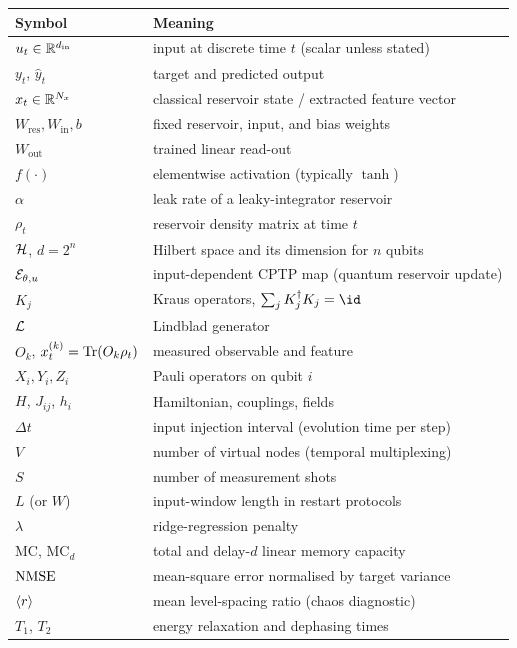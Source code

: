 \begin{center}
\small
\begin{tabular}{@{}ll@{}}
\toprule
Symbol & Meaning \\
\midrule
$u_t \in \mathbb{R}^{d_{\mathrm{in}}}$ & input at discrete time $t$ (scalar unless stated) \\
$y_t$, $\hat y_t$ & target and predicted output \\
$x_t \in \mathbb{R}^{N_x}$ & classical reservoir state / extracted feature vector \\
$W_{\mathrm{res}}, W_{\mathrm{in}}, b$ & fixed reservoir, input, and bias weights \\
$W_{\mathrm{out}}$ & trained linear read-out \\
$f(\cdot)$ & elementwise activation (typically $\tanh$) \\
$\alpha$ & leak rate of a leaky-integrator reservoir \\
$\rho_t$ & reservoir density matrix at time $t$ \\
$\mathcal{H}$, $d=2^n$ & Hilbert space and its dimension for $n$ qubits \\
$\mathcal{E}_{\theta,u}$ & input-dependent CPTP map (quantum reservoir update) \\
$K_j$ & Kraus operators, $\sum_j K_j^\dagger K_j = \id$ \\
$\mathcal{L}$ & Lindblad generator \\
$O_k$, $x_t^{(k)}=\operatorname{Tr}(O_k\rho_t)$ & measured observable and feature \\
$X_i, Y_i, Z_i$ & Pauli operators on qubit $i$ \\
$H$, $J_{ij}$, $h_i$ & Hamiltonian, couplings, fields \\
$\Delta t$ & input injection interval (evolution time per step) \\
$V$ & number of virtual nodes (temporal multiplexing) \\
$S$ & number of measurement shots \\
$L$ (or $W$) & input-window length in restart protocols \\
$\lambda$ & ridge-regression penalty \\
$\mathrm{MC}$, $\mathrm{MC}_d$ & total and delay-$d$ linear memory capacity \\
$\mathrm{NMSE}$ & mean-square error normalised by target variance \\
$\langle r\rangle$ & mean level-spacing ratio (chaos diagnostic) \\
$T_1$, $T_2$ & energy relaxation and dephasing times \\
\bottomrule
\end{tabular}
\end{center}
